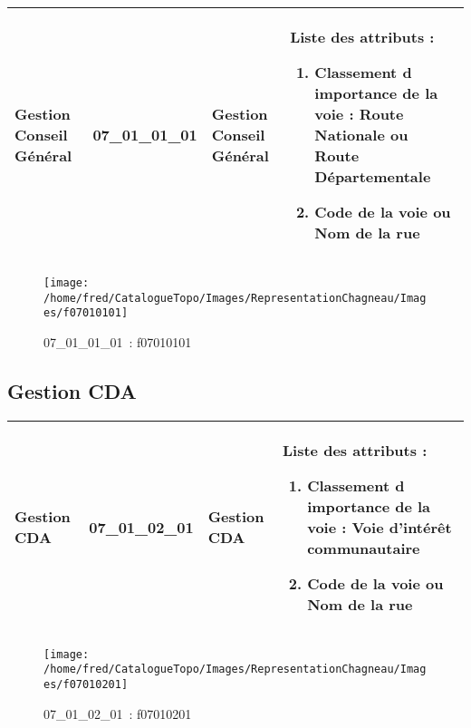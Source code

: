 \documentclass[12pt,titlepage]{book}
\begin{document}
\renewcommand{\arraystretch}{1.2}
\begin{supertabular}{|p{10cm}|c|p{13cm}|p{12cm}|}
 Gestion Conseil Général & 07\_01\_01\_01 & Gestion Conseil Général & Liste des attributs :
\begin{enumerate}
  \item Classement d importance de la voie : Route Nationale ou Route Départementale  \item Code de la voie ou Nom de la rue\end{enumerate}
\\
\hline
\end{supertabular}
\begin{figure}[h!]
  \hfill         %
  \begin{minipage}[t]{3cm}
    \begin{center}
      \texttt{[image: /home/fred/CatalogueTopo/Images/RepresentationChagneau/Images/f07010101]}
      \caption[~07\_01\_01\_01]{\small{07\_01\_01\_01~:} \tiny{f07010101}}\label{f07010101}
    \end{center}
  \end{minipage}
\end{figure}


\subsection{Gestion CDA}
\noindent
\vspace{\baselineskip}

\renewcommand{\arraystretch}{1.2}
\begin{supertabular}{|p{10cm}|c|p{13cm}|p{12cm}|}
 Gestion CDA & 07\_01\_02\_01 & Gestion CDA & Liste des attributs :
\begin{enumerate}
  \item Classement d importance de la voie : Voie d'intérêt communautaire  \item Code de la voie ou Nom de la rue\end{enumerate}
\\
\hline
\end{supertabular}
\begin{figure}[h!]
  \hfill         %
  \begin{minipage}[t]{3cm}
    \begin{center}
      \texttt{[image: /home/fred/CatalogueTopo/Images/RepresentationChagneau/Images/f07010201]}
      \caption[~07\_01\_02\_01]{\small{07\_01\_02\_01~:} \tiny{f07010201}}\label{f07010201}
    \end{center}
  \end{minipage}
\end{figure}
\end{document}
